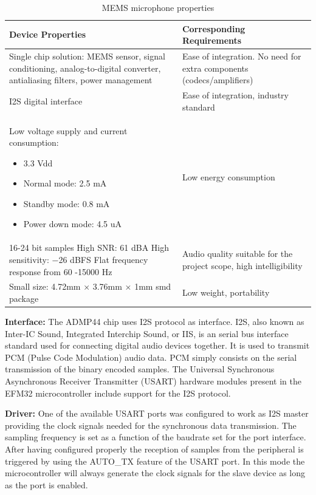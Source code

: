 \begin{table}[htb]
\centering
\begin{tabular}{|m{}|m{}|}
\hline 
	\textbf{Device Properties} &
	\textbf{Corresponding Requirements}  \\ 
\hline
	Single chip solution: MEMS sensor, signal conditioning, analog-to-digital converter, antialiasing filters, power management
	&
	Ease of integration. No need for extra components (codecs/amplifiers)\\ 
\hline 
	I2S digital interface 
	&
	Ease of integration, industry standard \\
\hline
	Low voltage supply and current consumption: 
	\begin{itemize}
	\item 3.3 Vdd 
	\item Normal mode: 2.5 mA 
	\item Standby mode: 0.8 mA
	\item Power down mode: 4.5 uA
	\end{itemize}
	&
	Low energy consumption \\
\hline
	16-24 bit samples \newline
	High SNR: 61 dBA \newline
	High sensitivity: −26 dBFS \newline
	Flat frequency response from 60 -15000 Hz
	&
	Audio quality suitable for the project scope, high intelligibility \\
\hline
	Small size: 4.72mm × 3.76mm × 1mm smd package 
	&
	Low weight, portability
\\\hline	
\end{tabular} 
\caption{MEMS microphone properties}
\label{tab:microphone_properties}
\end{table}

\textbf{Interface:} The ADMP44 chip uses I2S protocol as interface. I2S, also known as Inter-IC Sound, Integrated Interchip Sound, or IIS, is an serial bus interface standard used for connecting digital audio devices together. It is used to transmit PCM (Pulse Code Modulation) audio data. PCM simply consists on the serial transmission of the binary encoded samples.
The Universal Synchronous Asynchronous Receiver Transmitter (USART) hardware modules present in the EFM32 microcontroller include support for the I2S protocol.


\textbf{Driver:} One of the available USART ports was configured to work as I2S master providing the clock signals needed for the synchronous data transmission. The sampling frequency is set as a function of the baudrate set for the port interface. After having configured properly the reception of samples from the peripheral is triggered by using the AUTO\_TX feature of the USART port. In this mode the microcontroller will always generate the clock signals for the slave device as long as the port is enabled.


